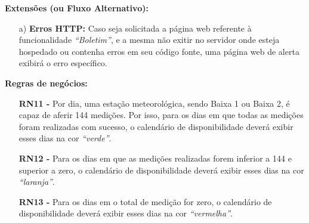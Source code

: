 \begin{quadro}[H]
\begin{framed}
\begin{flushleft}
		\textbf{Extensões (ou Fluxo Alternativo):}
		\begin{itemize}
			\item[a)] \textbf{Erros HTTP:} Caso seja solicitada a página web referente à funcionalidade \textit{``Boletim''}, e a mesma não exitir no servidor onde esteja hospedado ou contenha erros em seu código fonte, uma página web de alerta exibirá o erro específico.
		\end{itemize}

		\textbf{Regras de negócios:}
		\begin{itemize}
			\item[] \textbf{RN11 - } Por dia, uma estação meteorológica, sendo Baixa 1 ou Baixa 2, é capaz de aferir 144 medições. Por isso, para os dias em que todas as medições foram realizadas com sucesso, o calendário de disponibilidade deverá exibir esses dias na cor \emph{``verde''}.

			\item[] \textbf{RN12 - } Para os dias em que as medições realizadas forem inferior a 144 e superior a zero, o calendário de disponibilidade deverá exibir esses dias na cor \emph{``laranja''}.

			\item[] \textbf{RN13 - } Para os dias em o total de medição for zero, o calendário de disponibilidade deverá exibir esses dias na cor \emph{``vermelha''}.
		\end{itemize}

		\end{flushleft}

	\end{framed}

\end {quadro} %

